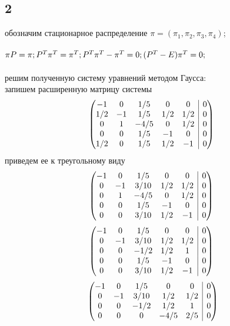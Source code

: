 \documentclass[a4paper]{article}
\begin{document}
\begin{large}
	\subsection*{2}
	обозначим стационарное распределение $\pi=(\pi_1,\pi_2,\pi_3,\pi_4)$;\\\\
	$
	\pi P=\pi;\\\\
	P^T\pi^T=\pi^T;\\\\
	P^T\pi^T-\pi^T=0;\\\\
	(P^T-E)\pi^T=0;
	$\\\\
	решим полученную систему уравнений методом Гаусса:\\
	запишем расширенную матрицу системы
	\[
	\begin{array}({@{}ccccc|c@{}})
		-1 & 0 & 1/5 & 0 & 0 & 0\\
		1/2 & -1 & 1/5 & 1/2 & 1/2 & 0\\
		0 & 1 & -4/5 & 0 & 1/2 & 0\\
		0 & 0 & 1/5 & -1 & 0 & 0\\
		1/2 & 0 & 1/5 & 1/2 & -1 & 0
	\end{array}\
	\]
	приведем ее к треугольному виду
	\[
	\begin{array}({@{}ccccc|c@{}})
		-1 & 0 & 1/5 & 0 & 0 & 0\\
		0 & -1 & 3/10 & 1/2 & 1/2 & 0\\
		0 & 1 & -4/5 & 0 & 1/2 & 0\\
		0 & 0 & 1/5 & -1 & 0 & 0\\
		0 & 0 & 3/10 & 1/2 & -1 & 0
	\end{array}\
	\]
	\[
	\begin{array}({@{}ccccc|c@{}})
		-1 & 0 & 1/5 & 0 & 0 & 0\\
		0 & -1 & 3/10 & 1/2 & 1/2 & 0\\
		0 & 0 & -1/2 & 1/2 & 1 & 0\\
		0 & 0 & 1/5 & -1 & 0 & 0\\
		0 & 0 & 3/10 & 1/2 & -1 & 0
	\end{array}\
	\]
	\[
	\begin{array}({@{}ccccc|c@{}})
		-1 & 0 & 1/5 & 0 & 0 & 0\\
		0 & -1 & 3/10 & 1/2 & 1/2 & 0\\
		0 & 0 & -1/2 & 1/2 & 1 & 0\\
		0 & 0 & 0 & -4/5 & 2/5 & 0\\

\end{array}\]
\end{large}
\end{document}
